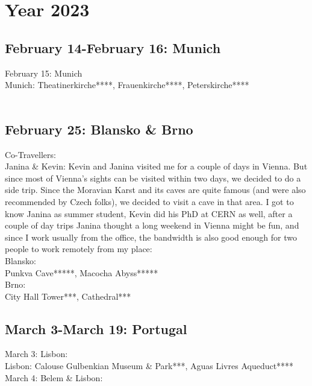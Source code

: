 \chapter{Year 2023}
\label{2023}

\section{February 14-February 16: Munich}
\label{2023:Munich}

February 15: Munich \\

Munich: Theatinerkirche****, Frauenkirche****, Peterskirche****\\\

\section{February 25: Blansko \& Brno}
\label{2023:Blansko}

Co-Travellers:\\
Janina \& Kevin: Kevin and Janina visited me for a couple of days in Vienna. But since most of Vienna's sights can be visited within two days, we decided to do a side trip. Since the Moravian Karst and its caves are quite famous (and were also recommended by Czech folks), we decided to visit a cave in that area. I got to know Janina as summer student, Kevin did his PhD at CERN as well, after a couple of day trips Janina thought a long weekend in Vienna might be fun, and since I work usually from the office, the bandwidth is also good enough for two people to work remotely from my place:\\

Blansko:\\
Punkva Cave*****, Macocha Abyss*****\\

Brno:\\
City Hall Tower***, Cathedral***\\

\section{March 3-March 19: Portugal}
\label{2023:Portugal}

March 3: Lisbon:\\

Lisbon: Calouse Gulbenkian Museum \& Park***, Aguas Livres Aqueduct****\\

March 4: Belem \& Lisbon:\\

